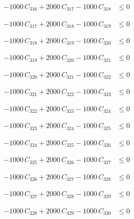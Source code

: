 \documentclass[a4paper,11pt]{article}
\begin{document}
\begin{align}
-1000\,C_{316} + 2000\,C_{317} - 1000\,C_{318} &\leq 0 \nonumber
\end{align}

\begin{align}
-1000\,C_{317} + 2000\,C_{318} - 1000\,C_{319} &\leq 0 \nonumber
\end{align}

\begin{align}
-1000\,C_{318} + 2000\,C_{319} - 1000\,C_{320} &\leq 0 \nonumber
\end{align}

\begin{align}
-1000\,C_{319} + 2000\,C_{320} - 1000\,C_{321} &\leq 0 \nonumber
\end{align}

\begin{align}
-1000\,C_{320} + 2000\,C_{321} - 1000\,C_{322} &\leq 0 \nonumber
\end{align}

\begin{align}
-1000\,C_{321} + 2000\,C_{322} - 1000\,C_{323} &\leq 0 \nonumber
\end{align}

\begin{align}
-1000\,C_{322} + 2000\,C_{323} - 1000\,C_{324} &\leq 0 \nonumber
\end{align}

\begin{align}
-1000\,C_{323} + 2000\,C_{324} - 1000\,C_{325} &\leq 0 \nonumber
\end{align}

\begin{align}
-1000\,C_{324} + 2000\,C_{325} - 1000\,C_{326} &\leq 0 \nonumber
\end{align}

\begin{align}
-1000\,C_{325} + 2000\,C_{326} - 1000\,C_{327} &\leq 0 \nonumber
\end{align}

\begin{align}
-1000\,C_{326} + 2000\,C_{327} - 1000\,C_{328} &\leq 0 \nonumber
\end{align}

\begin{align}
-1000\,C_{327} + 2000\,C_{328} - 1000\,C_{329} &\leq 0 \nonumber
\end{align}

\begin{align}
-1000\,C_{328} + 2000\,C_{329} - 1000\,C_{330} &\leq 0 \nonumber
\end{align}
\end{document}
